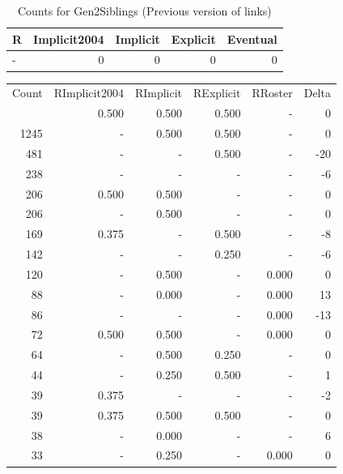 \documentclass[a4paper]{article}\usepackage[]{graphicx}\usepackage[]{color}
\begin{document}
\begin{table}[ht]
\centering
{\large
\begin{tabular}{lrrrr}
  \hline
R & Implicit2004 & Implicit & Explicit & Eventual \\ 
  \hline
- &   0 &   0 &   0 &   0 \\ 
   \hline
\end{tabular}
}
\caption{Counts for Gen2Siblings (Previous version of links)} 
\end{table}



\begin{table}[ht]
\centering
\begin{tabular}{rrrrrr}
  \hline
Count & RImplicit2004 & RImplicit & RExplicit & RRoster & Delta \\ 
  \rowcolor{goodColor}  \hline
1446 & 0.500 & 0.500 & 0.500 & - & 0 \\ 
   \rowcolor{goodColor} 1245 & - & 0.500 & 0.500 & - & 0 \\ 
   \rowcolor{sosoColor} 481 & - & - & 0.500 & - & -20 \\ 
   \rowcolor{nullColor} 238 & - & - & - & - & -6 \\ 
  206 & 0.500 & 0.500 & - & - & 0 \\ 
  206 & - & 0.500 & - & - & 0 \\ 
   \rowcolor{sosoColor} 169 & 0.375 & - & 0.500 & - & -8 \\ 
   \rowcolor{sosoColor} 142 & - & - & 0.250 & - & -6 \\ 
  120 & - & 0.500 & - & 0.000 & 0 \\ 
  88 & - & 0.000 & - & 0.000 & 13 \\ 
   \rowcolor{nullColor} 86 & - & - & - & 0.000 & -13 \\ 
  72 & 0.500 & 0.500 & - & 0.000 & 0 \\ 
   \rowcolor{badColor} 64 & - & 0.500 & 0.250 & - & 0 \\ 
   \rowcolor{badColor} 44 & - & 0.250 & 0.500 & - & 1 \\ 
   \rowcolor{nullColor} 39 & 0.375 & - & - & - & -2 \\ 
   \rowcolor{goodColor} 39 & 0.375 & 0.500 & 0.500 & - & 0 \\ 
  38 & - & 0.000 & - & - & 6 \\ 
  33 & - & 0.250 & - & 0.000 & 0 \\ 

\end{tabular}
\end{table}
\end{document}
